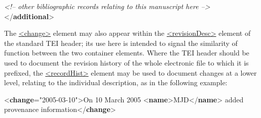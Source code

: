 \begin{shaded}
\hspace*{1em}\mbox{}\newline 
\textit{<!-- other bibliographic records relating to this manuscript here -->}\mbox{}\newline 
{}\mbox{}\newline 
{</\textbf{additional}>}\end{shaded}\egroup\par \par
The \hyperref[TEI.change]{<change>} element may also appear within the \hyperref[TEI.revisionDesc]{<revisionDesc>} element of the standard TEI header; its use here is intended to signal the similarity of function between the two container elements. Where the TEI header should be used to document the revision history of the whole electronic file to which it is prefixed, the \hyperref[TEI.recordHist]{<recordHist>} element may be used to document changes at a lower level, relating to the individual description, as in the following example: \par\bgroup{}\exampleFont \begin{shaded}\noindent\mbox{}{<\textbf{change}\hspace*{1em}{when}="{2005-03-10}">}On 10 March 2005 {<\textbf{name}>}MJD{</\textbf{name}>} added provenance\mbox{}\newline 
 information{</\textbf{change}>}\end{shaded}\egroup\par 
